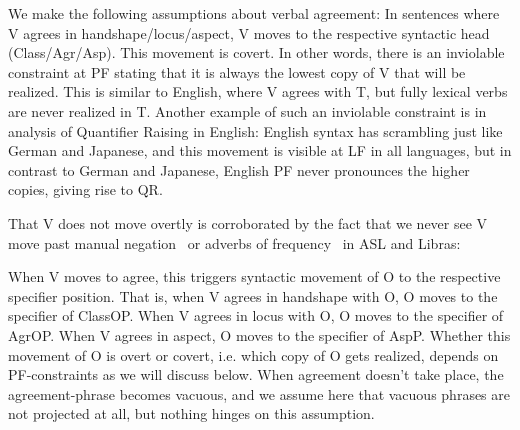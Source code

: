 \documentclass[output=paper]{langscibook}
\begin{document}
We make the following assumptions about verbal agreement:
In sentences where V agrees in handshape/locus/aspect, V
moves to the respective syntactic head (Class/Agr/Asp). This movement
is covert. In other words, there is an inviolable constraint at PF stating
that it is always the lowest copy of V that will be realized. This is
similar to English, where V agrees with T, but fully lexical verbs are
never realized in T. Another example of such an inviolable constraint
is in  analysis of Quantifier Raising in
English: English syntax has scrambling just like German and
Japanese, and this movement is visible at LF in all languages, but in
contrast to German and Japanese, English PF never pronounces the
higher copies, giving rise to QR.

That V does not move overtly is corroborated by the fact that
we never see V move past manual negation~ or adverbs of
frequency~ in ASL and Libras:

\ea
    \label{lasz:ex:8}
    \z 
\ex 
    \label{lasz:ex:9}
    \z
\z 

\noindent 
When V moves to agree, this triggers syntactic movement of O to the
respective specifier position. That is, when V agrees in handshape
with O, O moves to the specifier of ClassOP. When V agrees in
locus with O, O moves to the specifier of AgrOP. When V agrees in
aspect, O moves to the specifier of AspP. Whether this movement of O
is overt or covert, i.e. which copy of O gets realized, depends on
PF-constraints as we will discuss below. When agreement doesn’t take
place, the agreement-phrase becomes vacuous, and we assume here
that vacuous phrases are not projected at all, but nothing hinges on this
assumption.
\end{document}
